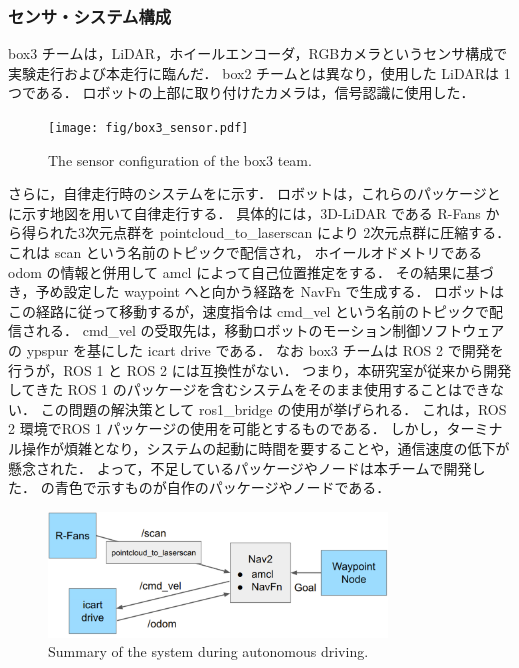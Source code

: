 \documentclass[twocolumn, 9pt]{jsproceedings}
\begin{document}
\subsubsection{センサ・システム構成}
box3 チームは，LiDAR，ホイールエンコーダ，RGBカメラというセンサ構成で実験走行および本走行に臨んだ．
box2 チームとは異なり，使用した LiDARは 1つである．
ロボットの上部に取り付けたカメラは，信号認識に使用した．

\begin{figure}[h!]
  \centering
  \texttt{[image: fig/box3\_sensor.pdf]}
  \caption{The sensor configuration of the box3 team.}
  \label{fig:box3-sensor}
\end{figure}


さらに，自律走行時のシステムをに示す．
ロボットは，これらのパッケージとに示す地図を用いて自律走行する．
具体的には，3D-LiDAR である R-Fans から得られた3次元点群を pointcloud\_to\_laserscan により
2次元点群に圧縮する．これは scan という名前のトピックで配信され，
ホイールオドメトリである odom の情報と併用して amcl\cite{amcl} によって自己位置推定をする．
その結果に基づき，予め設定した waypoint へと向かう経路を NavFn\cite{navfn} で生成する．
ロボットはこの経路に従って移動するが，速度指令は cmd\_vel という名前のトピックで配信される．
cmd\_vel の受取先は，移動ロボットのモーション制御ソフトウェアの ypspur\cite{ypspur} を基にした 
icart drive\cite{icart_driver} である．
なお box3 チームは ROS 2 で開発を行うが，ROS 1 と ROS 2 には互換性がない．
つまり，本研究室が従来から開発してきた ROS 1 のパッケージを含むシステムをそのまま使用することはできない．
この問題の解決策として ros1\_bridge\cite{bridge} の使用が挙げられる．
これは，ROS 2 環境でROS 1 パッケージの使用を可能とするものである．
しかし，ターミナル操作が煩雑となり，システムの起動に時間を要することや，通信速度の低下が懸念された．
よって，不足しているパッケージやノードは本チームで開発した． 
の青色で示すものが自作のパッケージやノードである．

\begin{figure}[h!]
  \centering
  \includegraphics[width=90mm]{fig/box3_system.pdf}
  \caption{Summary of the system during autonomous driving.}
  \label{fig:box3-system}
\end{figure}
\end{document}
